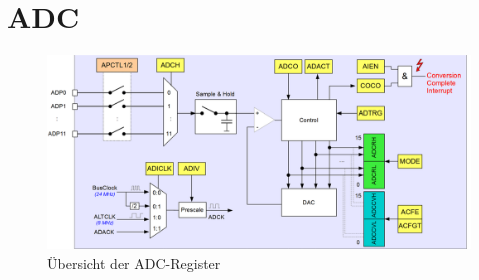 \newpage
\section{ADC}

\begin{figure}[h!]
	\centering
	\includegraphics[width=1\textwidth]{../fig/adc.pdf}
	\caption{Übersicht der ADC-Register}
\end{figure}
